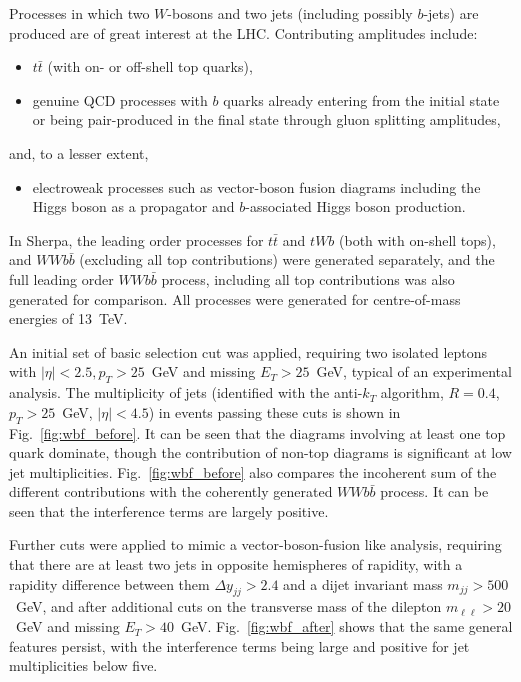 \documentclass[11pt]{cernrep}
\begin{document}
Processes in which two $W$-bosons and two jets (including possibly $b$-jets) are produced are of great interest
at the LHC. Contributing amplitudes include:
\begin{itemize}
\item $t\bar{t}$ (with on- or off-shell top quarks),
\item genuine QCD processes with $b$ quarks already entering from the initial state or being
  pair-produced in the final state through gluon splitting amplitudes, 
\end{itemize}
and, to a lesser extent,
\begin{itemize}
\item electroweak processes such as vector-boson fusion diagrams including the Higgs boson
  as a propagator and $b$-associated Higgs boson production.
\end{itemize}
In Sherpa, the leading order processes for $t\bar{t}$ and $tWb$ (both with on-shell tops), and $WWb\bar{b}$
(excluding all top contributions) were generated separately, and the full leading order $WWb\bar{b}$ process,
including all top contributions was also generated for comparison. All processes were generated for centre-of-mass
energies of 13~TeV. 

An initial set of basic selection cut was applied, requiring two isolated leptons with $|\eta| < 2.5, p_T > 25$~GeV and
missing $E_T > 25$~GeV, typical of an experimental analysis. The multiplicity of jets (identified with the anti-$k_T$
algorithm, $R=0.4$, $p_T > 25$~GeV, $|\eta| < 4.5$) in events passing these cuts is shown in Fig.~\ref{fig:wbf_before}.
It can be seen that the diagrams involving at least one top quark dominate, though the contribution of non-top diagrams
is significant at low jet multiplicities. Fig.~\ref{fig:wbf_before} also compares the incoherent sum of the different
contributions with the coherently generated $WWb\bar{b}$ process. It can be seen that the interference terms are largely
positive.

Further cuts were applied to mimic a vector-boson-fusion like analysis, requiring that there are at least two jets in
opposite hemispheres of rapidity, with a rapidity difference between them
$\Delta y_{jj} > 2.4$ and a dijet invariant
mass $m_{jj}>500$~GeV, and after additional cuts on the transverse mass
of the dilepton $m_{\ell\ell} > 20$~GeV and missing $E_T > 40$~GeV.
Fig.~\ref{fig:wbf_after} shows that the same general features persist, with the interference terms being large and
positive for jet multiplicities below five.
\end{document}
